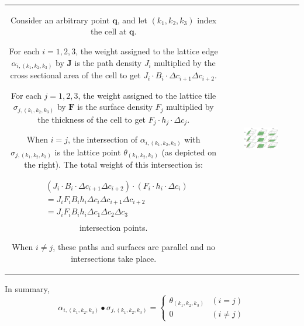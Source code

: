\begin{tabular}{cc}
\parbox{0.5\textwidth}{
Consider an arbitrary point \(\mathbf{q}\), and let \((k_1, k_2, k_3)\) index the cell at \(\mathbf{q}\). 

For each \(i = 1, 2, 3\), the weight assigned to the lattice edge \(\alpha_{i,(k_1,k_2,k_3)}\) by \(\mathbf{J}\) is the path density \(J_i\) multiplied by the cross sectional area of the cell to get \(J_i \cdot B_i \cdot \Delta c_{i+1} \Delta c_{i+2}\). 

For each \(j = 1, 2, 3\), the weight assigned to the lattice tile \(\sigma_{j,(k_1,k_2,k_3)}\) by \(\mathbf{F}\) is the surface density \(F_j\) multiplied by the thickness of the cell to get \(F_j \cdot h_j \cdot \Delta c_j\). 

When \(i = j\), the intersection of \(\alpha_{i, (k_1, k_2, k_3)}\) with \(\sigma_{j, (k_1, k_2, k_3)}\) is the lattice point \(\theta_{(k_1, k_2, k_3)}\) (as depicted on the right). The total weight of this intersection is:

\begin{align*}
& (J_i \cdot B_i \cdot \Delta c_{i+1} \Delta c_{i+2}) \cdot (F_i \cdot h_i \cdot \Delta c_i) \\
& = J_i F_i B_i h_i \Delta c_i \Delta c_{i+1} \Delta c_{i+2} \\
& = J_i F_i B_i h_i \Delta c_1 \Delta c_2 \Delta c_3 \\
\end{align*}
intersection points. 

When \(i \neq j\), these paths and surfaces are parallel and no intersections take place. 
} & \parbox{0.5\textwidth}{
\includegraphics[width = 0.5\textwidth]{Coordinate_systems/path_surface_intersection_cell}
}
\end{tabular}

\vspace{1mm}

In summary, 
\[\alpha_{i, (k_1,k_2,k_3)} \bullet \sigma_{j, (k_1,k_2,k_3)} = \left\{\begin{array}{cc} \theta_{(k_1, k_2, k_3)} & (i = j) \\ 0 & (i \neq j) \end{array}\right.\]

